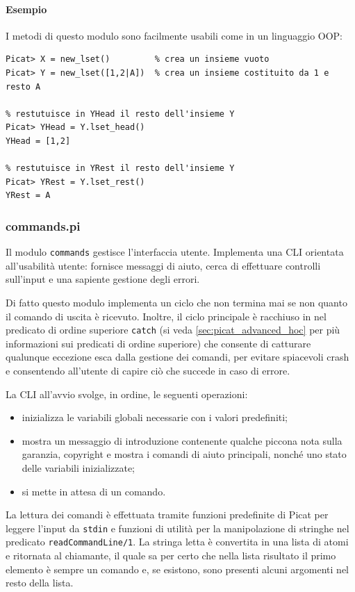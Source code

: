 \documentclass[12pt,a4paper,openright]{book} %
\begin{document}
\paragraph{Esempio}

I metodi di questo modulo sono facilmente usabili come in un linguaggio OOP:
\begin{verbatim}
Picat> X = new_lset()         % crea un insieme vuoto
Picat> Y = new_lset([1,2|A])  % crea un insieme costituito da 1 e resto A

% restutuisce in YHead il resto dell'insieme Y
Picat> YHead = Y.lset_head()
YHead = [1,2]

% restutuisce in YRest il resto dell'insieme Y
Picat> YRest = Y.lset_rest()
YRest = A
\end{verbatim}


\subsubsection{commands.pi}

Il modulo \texttt{commands} gestisce l'interfaccia utente. Implementa
una CLI orientata all'usabilità utente: fornisce messaggi di aiuto,
cerca di effettuare controlli sull'input e una sapiente gestione degli
errori.

Di fatto questo modulo implementa un ciclo che non termina mai se non
quanto il comando di uscita è ricevuto. Inoltre, il ciclo principale è
racchiuso in nel predicato di ordine superiore \texttt{catch} (si veda
\ref{sec:picat_advanced_hoc} per più informazioni sui predicati di
ordine superiore) che consente di catturare qualunque eccezione esca
dalla gestione dei comandi, per evitare spiacevoli crash e consentendo
all'utente di capire ciò che succede in caso di errore.

La CLI all'avvio svolge, in ordine, le seguenti operazioni:
\begin{itemize}
	\item inizializza le variabili globali necessarie con i valori
          predefiniti;
	\item mostra un messaggio di introduzione contenente qualche
          piccona nota sulla garanzia, copyright e mostra i comandi di
          aiuto principali, nonché uno stato delle variabili
          inizializzate;
	\item si mette in attesa di un comando.
\end{itemize}

La lettura dei comandi è effettuata tramite funzioni predefinite di
Picat per leggere l'input da \texttt{stdin} e funzioni di utilità per
la manipolazione di stringhe nel predicato
\texttt{readCommandLine/1}. La stringa letta è convertita in una lista
di atomi e ritornata al chiamante, il quale sa per certo che nella
lista risultato il primo elemento è sempre un comando e, se esistono,
sono presenti alcuni argomenti nel resto della lista.
\end{document}
